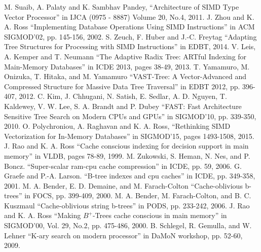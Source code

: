 \documentclass[conference]{IEEEtran}
\begin{document}

\begin{thebibliography}{00}
M. Suaib, A. Palaty and K. Sambhav Pandey, ``Architecture of SIMD Type Vector Processor'' in IJCA (0975 - 8887) Volume 20, No.4, 2011.
 J. Zhou and K. A. Ross  ``Implementing Database Operations Using SIMD Instructions'' in ACM SIGMOD’02, pp. 145-156, 2002.%
 S. Zeuch, F. Huber and J.-C. Freytag  ``Adapting Tree Structures for Processing with SIMD Instructions'' in EDBT, 2014.%
 V. Leis, A. Kemper and T. Neumann ``The Adaptive Radix Tree: ARTful Indexing for Main-Memory Databases'' in ICDE 2013, pages 38-49, 2013.
 T. Yamamuro, M. Onizuka, T. Hitaka, and M. Yamamuro ``VAST-Tree: A Vector-Advanced and Compressed Structure for Massive Data Tree Traversal'' in EDBT 2012, pp. 396-407, 2012.%
 C. Kim, J. Chhugani, N. Satish, E. Sedlar, A. D. Nguyen, T. Kaldewey, V. W. Lee, S. A. Brandt and P. Dubey ``FAST: Fast Architecture Sensitive Tree Search on Modern CPUs and GPUs'' in SIGMOD’10, pp. 339-350, 2010.%
O. Polychroniou, A. Raghavan and K. A. Ross, ``Rethinking SIMD Vectorization for In-Memory Databases'' in SIGMOD’15, pages 1493-1508, 2015.%
 J. Rao and K. A. Ross ``Cache conscious indexing for decision support in main memory'' in VLDB, pages 78-89, 1999.
  M. Zukowski, S. Heman, N. Nes, and P. Boncz. ``Super-scalar ram-cpu cache compression'' in ICDE, pp. 59, 2006.
 G. Graefe and P.-A. Larson. ``B-tree indexes and cpu caches'' in ICDE, pp. 349-358, 2001.
 M. A. Bender, E. D. Demaine, and M. Farach-Colton ``Cache-oblivious b-trees'' in FOCS, pp. 399-409, 2000.
 M. A. Bender, M. Farach-Colton, and B. C. Kuszmaul ``Cache-oblivious string b-trees'' in PODS, pp. 233-242, 2006.
 J. Rao and K. A. Ross ``Making $B^+$-Trees cache conscious in main memory'' in SIGMOD’00, Vol. 29, No.2, pp. 475-486, 2000.
 B. Schlegel, R. Gemulla, and W. Lehner ``K-ary search on modern processor'' in DaMoN workshop, pp. 52-60, 2009.
\end{thebibliography}
\end{document}

